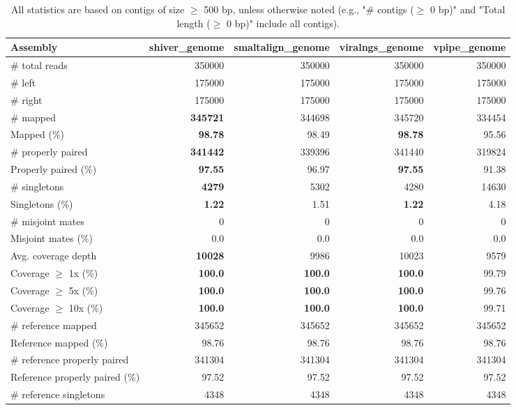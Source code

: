 \documentclass[12pt,a4paper]{article}
\begin{document}
\begin{table}[ht]
\begin{center}
\caption{All statistics are based on contigs of size $\geq$ 500 bp, unless otherwise noted (e.g., "\# contigs ($\geq$ 0 bp)" and "Total length ($\geq$ 0 bp)" include all contigs).}
\begin{tabular}{|l*{4}{|r}|}
\hline
Assembly & shiver\_genome & smaltalign\_genome & viralngs\_genome & vpipe\_genome \\ \hline
\# total reads & 350000 & 350000 & 350000 & 350000 \\ \hline
\# left & 175000 & 175000 & 175000 & 175000 \\ \hline
\# right & 175000 & 175000 & 175000 & 175000 \\ \hline
\# mapped & {\bf 345721} & 344698 & 345720 & 334454 \\ \hline
Mapped (\%) & {\bf 98.78} & 98.49 & {\bf 98.78} & 95.56 \\ \hline
\# properly paired & {\bf 341442} & 339396 & 341440 & 319824 \\ \hline
Properly paired (\%) & {\bf 97.55} & 96.97 & {\bf 97.55} & 91.38 \\ \hline
\# singletons & {\bf 4279} & 5302 & 4280 & 14630 \\ \hline
Singletons (\%) & {\bf 1.22} & 1.51 & {\bf 1.22} & 4.18 \\ \hline
\# misjoint mates & 0 & 0 & 0 & 0 \\ \hline
Misjoint mates (\%) & 0.0 & 0.0 & 0.0 & 0.0 \\ \hline
Avg. coverage depth & {\bf 10028} & 9986 & 10023 & 9579 \\ \hline
Coverage $\geq$ 1x (\%) & {\bf 100.0} & {\bf 100.0} & {\bf 100.0} & 99.79 \\ \hline
Coverage $\geq$ 5x (\%) & {\bf 100.0} & {\bf 100.0} & {\bf 100.0} & 99.76 \\ \hline
Coverage $\geq$ 10x (\%) & {\bf 100.0} & {\bf 100.0} & {\bf 100.0} & 99.71 \\ \hline
\# reference mapped & 345652 & 345652 & 345652 & 345652 \\ \hline
Reference mapped (\%) & 98.76 & 98.76 & 98.76 & 98.76 \\ \hline
\# reference properly paired & 341304 & 341304 & 341304 & 341304 \\ \hline
Reference properly paired (\%) & 97.52 & 97.52 & 97.52 & 97.52 \\ \hline
\# reference singletons & 4348 & 4348 & 4348 & 4348 \\ \hline

\end{tabular}
\end{center}
\end{table}
\end{document}
